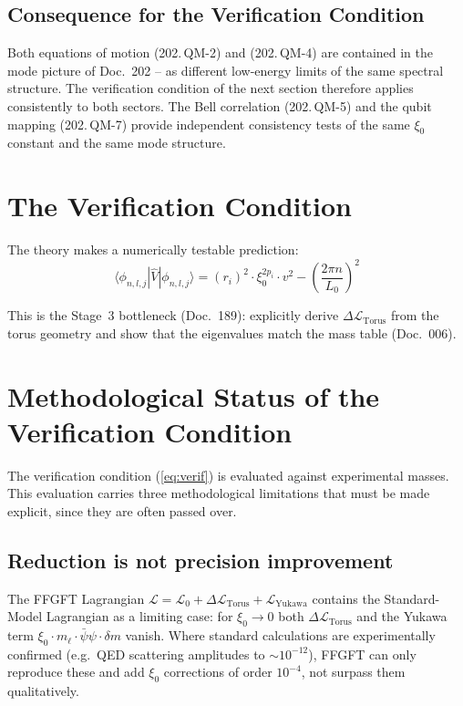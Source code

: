 \subsection*{Consequence for the Verification Condition}

Both equations of motion (202.\,QM-2) and (202.\,QM-4) are contained
in the mode picture of Doc.~202 -- as different low-energy limits of
the same spectral structure. The verification condition of the next
section therefore applies consistently to both sectors. The Bell
correlation (202.\,QM-5) and the qubit mapping (202.\,QM-7) provide
independent consistency tests of the same $\xi_0$ constant and the
same mode structure.

\section{The Verification Condition}

The theory makes a numerically testable prediction:
\begin{equation}
  \boxed{
    \langle\phi_{n,l,j}|\hat{V}|\phi_{n,l,j}\rangle
    = (r_i)^2 \cdot \xi_0^{2p_i} \cdot v^2
      - \left(\frac{2\pi n}{L_0}\right)^2
  }
  \label{eq:verif}
\end{equation}

This is the Stage~3 bottleneck (Doc.~189): explicitly derive
$\Delta\mathcal{L}_{\text{Torus}}$ from the torus geometry and show
that the eigenvalues match the mass table (Doc.~006).

\section{Methodological Status of the Verification Condition}

The verification condition (\ref{eq:verif}) is evaluated against
experimental masses. This evaluation carries three methodological
limitations that must be made explicit, since they are often passed
over.

\subsection*{Reduction is not precision improvement}

The FFGFT Lagrangian
$\mathcal{L} = \mathcal{L}_0 + \Delta\mathcal{L}_{\text{Torus}} + \mathcal{L}_{\text{Yukawa}}$
contains the Standard-Model Lagrangian as a limiting case: for
$\xi_0 \to 0$ both $\Delta\mathcal{L}_{\text{Torus}}$ and the Yukawa
term $\xi_0\cdot m_\ell\cdot\bar\psi\psi\cdot\delta m$ vanish. Where
standard calculations are experimentally confirmed (e.g.\ QED
scattering amplitudes to $\sim 10^{-12}$), FFGFT can only reproduce
these and add $\xi_0$ corrections of order $10^{-4}$, not surpass them
qualitatively.

